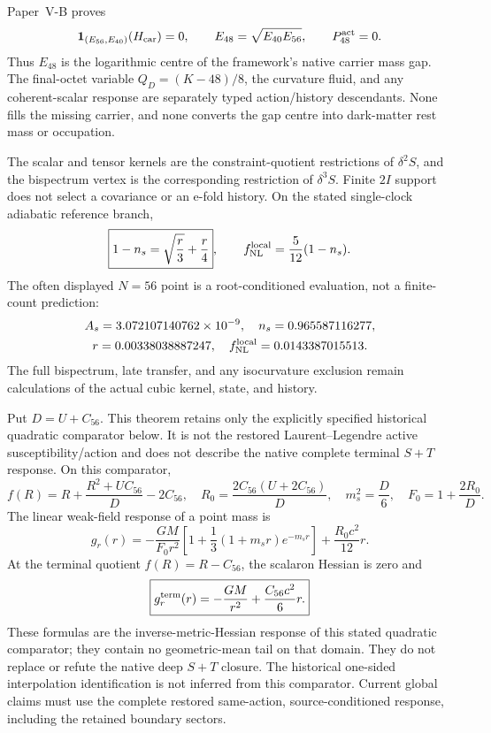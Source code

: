 \documentclass[12pt,a4paper]{article}
\begin{document}
\begin{corollary}
\label{p8:cor:v165-e48-gap-cosmic-firewall}
Paper~V-B proves
\[
 \mathbf1_{(E_{56},E_{40})}(H_{\rm car})=0,
 \qquad
 E_{48}=\sqrt{E_{40}E_{56}},
 \qquad
 P_{48}^{\rm act}=0.
\]
Thus \(E_{48}\) is the logarithmic centre of the framework's native carrier
mass gap.  The final-octet variable \(Q_D=(K-48)/8\), the curvature fluid,
and any coherent-scalar response are separately typed action/history
descendants.  None fills the missing carrier, and none converts the gap centre
into dark-matter rest mass or occupation.
\end{corollary}

\begin{theorem}
\label{p8:thm:v164-perturbation-owner}
The scalar and tensor kernels are the constraint-quotient restrictions of
\(\delta^2S\), and the bispectrum vertex is the corresponding restriction of
\(\delta^3S\).  Finite \(2I\) support does not select a covariance or an
e-fold history.  On the stated single-clock adiabatic reference branch,
\[
 \boxed{1-n_s=\sqrt{\frac r3}+\frac r4},
 \qquad
 f_{\rm NL}^{\rm local}=\frac5{12}(1-n_s).
\]
The often displayed \(N=56\) point is a root-conditioned evaluation, not a
finite-count prediction:
\[
 \begin{gathered}
 A_s=3.072107140762\times10^{-9},\quad n_s=0.965587116277,\\
 r=0.00338038887247,\quad f_{\rm NL}^{\rm local}=0.0143387015513.
 \end{gathered}
\]
The full bispectrum, late transfer, and any isocurvature exclusion remain
calculations of the actual cubic kernel, state, and history.
\end{theorem}

\begin{theorem}
\label{p8:thm:v164-static-metric-response}
Put \(D=U+C_{56}\).  This theorem retains only the explicitly
specified historical quadratic comparator below.  It is not the restored
Laurent--Legendre active susceptibility/action and does not describe the
native complete terminal \(S+T\) response.  On this comparator,
\[
 f(R)=R+\frac{R^2+UC_{56}}D-2C_{56},
 \quad
 R_0=\frac{2C_{56}(U+2C_{56})}{D},
 \quad
 m_s^2=\frac D6,
 \quad
 F_0=1+\frac{2R_0}{D}.
\]
The linear weak-field response of a point mass is
\[
 \boxed{
 g_r(r)=-\frac{GM}{F_0r^2}
 \left[1+\frac13(1+m_sr)e^{-m_sr}\right]
 +\frac{R_0c^2}{12}r.}
\]
At the terminal quotient \(f(R)=R-C_{56}\), the scalaron Hessian is zero
and
\[
 \boxed{g_r^{\rm term}(r)=-\frac{GM}{r^2}+\frac{C_{56}c^2}{6}r.}
\]
These formulas are the inverse-metric-Hessian response of this stated
quadratic comparator; they contain no geometric-mean tail on that domain.
They do not replace or refute the native deep $S+T$ closure.  The historical
one-sided interpolation identification is not inferred from this comparator.
Current global claims must use the complete restored same-action,
source-conditioned response, including the retained boundary sectors.
\end{theorem}
\end{document}
